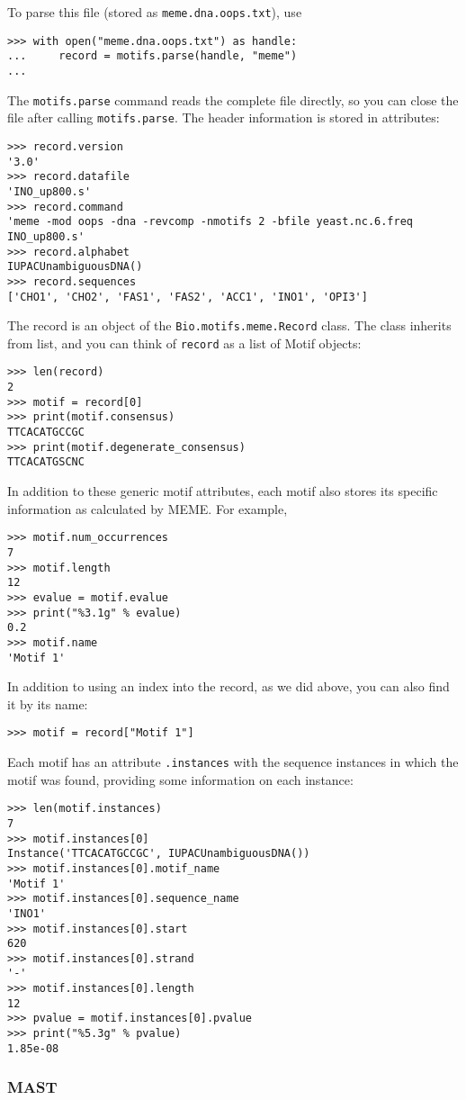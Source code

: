 To parse this file (stored as \verb+meme.dna.oops.txt+), use
\begin{verbatim}
>>> with open("meme.dna.oops.txt") as handle:
...     record = motifs.parse(handle, "meme")
...
\end{verbatim}
The \verb+motifs.parse+ command reads the complete file directly, so you can
close the file after calling \verb+motifs.parse+.
The header information is stored in attributes:
\begin{verbatim}
>>> record.version
'3.0'
>>> record.datafile
'INO_up800.s'
>>> record.command
'meme -mod oops -dna -revcomp -nmotifs 2 -bfile yeast.nc.6.freq INO_up800.s'
>>> record.alphabet
IUPACUnambiguousDNA()
>>> record.sequences
['CHO1', 'CHO2', 'FAS1', 'FAS2', 'ACC1', 'INO1', 'OPI3']
\end{verbatim}
The record is an object of the \verb+Bio.motifs.meme.Record+ class.
The class inherits from list, and you can think of \verb+record+ as a list of Motif objects:
\begin{verbatim}
>>> len(record)
2
>>> motif = record[0]
>>> print(motif.consensus)
TTCACATGCCGC
>>> print(motif.degenerate_consensus)
TTCACATGSCNC
\end{verbatim}
In addition to these generic motif attributes, each motif also stores its
specific information as calculated by MEME. For example,
\begin{verbatim}
>>> motif.num_occurrences
7
>>> motif.length
12
>>> evalue = motif.evalue
>>> print("%3.1g" % evalue)
0.2
>>> motif.name
'Motif 1'
\end{verbatim}
In addition to using an index into the record, as we did above,
you can also find it by its name:
\begin{verbatim}
>>> motif = record["Motif 1"]
\end{verbatim}
Each motif has an attribute \verb+.instances+ with the sequence instances
in which the motif was found, providing some information on each instance:
\begin{verbatim}
>>> len(motif.instances)
7
>>> motif.instances[0]
Instance('TTCACATGCCGC', IUPACUnambiguousDNA())
>>> motif.instances[0].motif_name
'Motif 1'
>>> motif.instances[0].sequence_name
'INO1'
>>> motif.instances[0].start
620
>>> motif.instances[0].strand
'-'
>>> motif.instances[0].length
12
>>> pvalue = motif.instances[0].pvalue
>>> print("%5.3g" % pvalue)
1.85e-08
\end{verbatim}

\subsubsection*{MAST}

